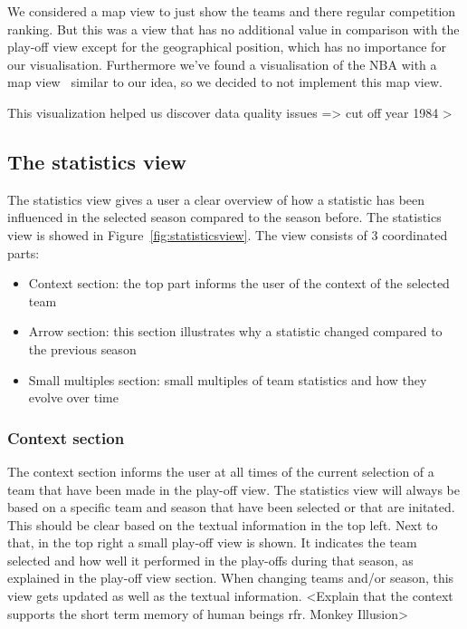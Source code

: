 \documentclass{sigchi}
\begin{document}
We considered a map view to just show the teams and there regular competition ranking. But this was a view that has no additional value in comparison with the play-off view except for the geographical position, which has no importance for our visualisation. Furthermore we've found a visualisation of the NBA with a map view~\cite{mapviewvisualization} similar to our idea, so we decided to not implement this map view. 

This visualization helped us discover data quality issues => cut off year 1984
>


\subsection{The statistics view}
The statistics view gives a user a clear overview of how a statistic has been influenced in the selected season compared to the season before. The statistics view is showed in Figure~\ref{fig:statisticsview}. The view consists of 3 coordinated parts:
\begin{itemize}
    \item Context section: the top part informs the user of the context of the selected team
    \item Arrow section: this section illustrates why a statistic changed compared to the previous season
    \item Small multiples section: small multiples of team statistics and how they evolve over time
\end{itemize}

\subsubsection{Context section}
The context section informs the user at all times of the current selection of a team  
that have been made in the play-off view. The statistics view will always be based on a specific team and season that have been selected or that are initated. This should be clear based on the textual information in the top left. Next to that, in the top right a small play-off view is shown. It indicates the team selected and how well it performed in  the play-offs during that season, as explained in the play-off view section. When changing teams and/or season, this view gets updated as well as the textual information. <Explain that the context supports the short term memory of human beings rfr. Monkey Illusion>
\end{document}
